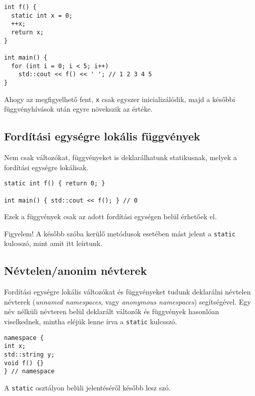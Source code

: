 \documentclass[../cpp_book/cpp_book.tex]{subfiles}
\begin{document}
	\begin{lstlisting}
int f() {
  static int x = 0;
  ++x;
  return x;
}

int main() {
  for (int i = 0; i < 5; i++)
    std::cout << f() << ' '; // 1 2 3 4 5
}
	\end{lstlisting}
	Ahogy az megfigyelhető fent, \texttt{x} csak egyszer inicializálódik, majd a későbbi függvényhívások után egyre növekszik az értéke.
	\subsection{Fordítási egységre lokális függvények}
  Nem csak változókat, függvényeket is deklarálhatunk statikusnak, melyek a fordítási egységre lokálisak. 
	\begin{lstlisting}
static int f() { return 0; }

int main() { std::cout << f(); } // 0
	\end{lstlisting}
	Ezek a függvények csak az adott fordítási egységen belül érhetőek el.
	\begin{note}
		Figyelem! A később szóba kerülő metódusok esetében mást jelent a \texttt{static} kulcsszó, mint amit itt leírtunk.
	\end{note}
	\subsection{Névtelen/anonim névterek}
	Fordítási egységre lokális változókat és függvényeket tudunk deklarálni névtelen névterek (\textit{unnamed namespaces}, vagy \textit{anonymous namespaces}) segítségével. Egy név nélküli névteren belül deklarált változók és függvények hasonlóan viselkednek, mintha eléjük lenne írva a \texttt{static} kulcsszó.
	\begin{lstlisting}
namespace {
int x;
std::string y;
void f() {}
} // namespace
	\end{lstlisting}
	\begin{note}
    A \texttt{static} osztályon belüli jelentéséről később lesz szó.
	\end{note}
\end{document}
